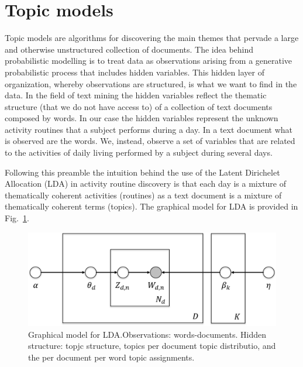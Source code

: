 \section{Topic models}

Topic models are algorithms for discovering the main themes that pervade a large and otherwise unstructured collection of documents.
The idea behind probabilistic modelling is to treat data as observations arising from a generative probabilistic process that includes hidden variables. This hidden layer of organization, whereby observations are structured, is what we want to find in the data. 
In the field of text mining the hidden variables reflect the thematic structure (that we do not have access to) of a collection of text documents composed by words. In our case the hidden variables represent the unknown activity routines that a subject performs during a day.
In a text document what is observed are the words. We, instead, observe a set of variables that are related to the activities of daily living performed by a subject during several days.


Following this preamble the intuition behind the use of the Latent Dirichelet Allocation (LDA) in activity routine discovery is that each day is a mixture of thematically coherent activities (routines) as a text document is a mixture of thematically coherent terms (topics). %
The graphical model for LDA is provided in Fig.~\ref{fig:LDA_model}.

\begin{figure}[ht]
\centering
    \includegraphics[width=.40\textwidth]{figure/eps/LDA_model.eps}
  \caption{Graphical model for LDA.Observations: words-documents.
Hidden structure: topjc structure, topics per document topic distributio, and the per document per word topic assignments.}\label{fig:LDA_model}
\end{figure}

